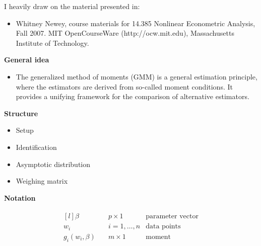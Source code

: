 \begin{frame} I heavily draw on the material presented in:

\begin{itemize}
\item Whitney Newey, course materials for 14.385 Nonlinear Econometric Analysis, Fall 2007. MIT OpenCourseWare
(http://ocw.mit.edu), Massachusetts Institute of Technology.
\end{itemize}

\end{frame}
\begin{frame}\textbf{General idea}\vspace{0.3cm}
\begin{itemize}\setlength\itemsep{1em}
\item The generalized method of moments (GMM) is a general estimation principle, where the estimators are derived from so-called  moment conditions. It provides a unifying framework for the comparison of alternative estimators.
\end{itemize}

\end{frame}
\begin{frame}\textbf{Structure}\vspace{0.3cm}

\begin{itemize}\setlength\itemsep{1em}
\item Setup
\item Identification
\item Asymptotic distribution
\item Weighing matrix
\end{itemize}
\end{frame}
\begin{frame}\textbf{Notation}\vspace{0.3cm}

\begin{align*}\begin{matrix*}[l]
\beta           &\quad p \times 1     & \text{parameter vector} \\
w_i             &\quad i = 1, \hdots, n & \text{data points}      \\
g_i(w_i, \beta) &\quad m \times 1 & \text{moment}
\end{matrix*}\end{align*}

\end{frame}

